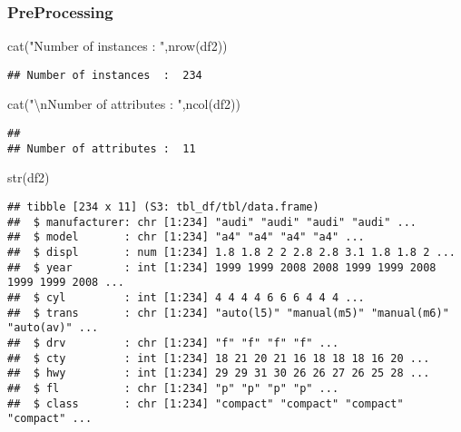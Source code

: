 \documentclass[
]{article}
\newenvironment{Shaded}{\begin{snugshade}}{\end{snugshade}}
\newcommand{\FunctionTok}[1]{\textcolor[rgb]{0.00,0.00,0.00}{#1}}
\newcommand{\NormalTok}[1]{#1}
\newcommand{\SpecialCharTok}[1]{\textcolor[rgb]{0.00,0.00,0.00}{#1}}
\newcommand{\StringTok}[1]{\textcolor[rgb]{0.31,0.60,0.02}{#1}}
\begin{document}
\hypertarget{preprocessing-1}{%
\subsubsection{PreProcessing}\label{preprocessing-1}}

\begin{Shaded}
\begin{Highlighting}[]
\FunctionTok{cat}\NormalTok{(}\StringTok{"Number of instances  : "}\NormalTok{,}\FunctionTok{nrow}\NormalTok{(df2))}
\end{Highlighting}
\end{Shaded}

\begin{verbatim}
## Number of instances  :  234
\end{verbatim}

\begin{Shaded}
\begin{Highlighting}[]
\FunctionTok{cat}\NormalTok{(}\StringTok{"}\SpecialCharTok{\textbackslash{}n}\StringTok{Number of attributes : "}\NormalTok{,}\FunctionTok{ncol}\NormalTok{(df2))}
\end{Highlighting}
\end{Shaded}

\begin{verbatim}
## 
## Number of attributes :  11
\end{verbatim}

\begin{Shaded}
\begin{Highlighting}[]
\FunctionTok{str}\NormalTok{(df2)}
\end{Highlighting}
\end{Shaded}

\begin{verbatim}
## tibble [234 x 11] (S3: tbl_df/tbl/data.frame)
##  $ manufacturer: chr [1:234] "audi" "audi" "audi" "audi" ...
##  $ model       : chr [1:234] "a4" "a4" "a4" "a4" ...
##  $ displ       : num [1:234] 1.8 1.8 2 2 2.8 2.8 3.1 1.8 1.8 2 ...
##  $ year        : int [1:234] 1999 1999 2008 2008 1999 1999 2008 1999 1999 2008 ...
##  $ cyl         : int [1:234] 4 4 4 4 6 6 6 4 4 4 ...
##  $ trans       : chr [1:234] "auto(l5)" "manual(m5)" "manual(m6)" "auto(av)" ...
##  $ drv         : chr [1:234] "f" "f" "f" "f" ...
##  $ cty         : int [1:234] 18 21 20 21 16 18 18 18 16 20 ...
##  $ hwy         : int [1:234] 29 29 31 30 26 26 27 26 25 28 ...
##  $ fl          : chr [1:234] "p" "p" "p" "p" ...
##  $ class       : chr [1:234] "compact" "compact" "compact" "compact" ...
\end{verbatim}
\end{document}
